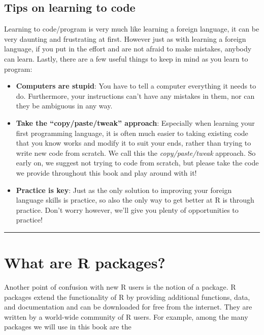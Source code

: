 \documentclass[12pt,]{krantz}
\providecommand{\tightlist}{%
  \setlength{\itemsep}{0pt}\setlength{\parskip}{0pt}}
\begin{document}
\subsection{Tips on learning to code}\label{tips-on-learning-to-code}

Learning to code/program is very much like learning a foreign language,
it can be very daunting and frustrating at first. However just as with
learning a foreign language, if you put in the effort and are not afraid
to make mistakes, anybody can learn. Lastly, there are a few useful
things to keep in mind as you learn to program:

\begin{itemize}
\tightlist
\item
  \textbf{Computers are stupid}: You have to tell a computer everything
  it needs to do. Furthermore, your instructions can't have any mistakes
  in them, nor can they be ambiguous in any way.
\item
  \textbf{Take the ``copy/paste/tweak'' approach}: Especially when
  learning your first programming language, it is often much easier to
  taking existing code that you know works and modify it to suit your
  ends, rather than trying to write new code from scratch. We call this
  the \emph{copy/paste/tweak} approach. So early on, we suggest not
  trying to code from scratch, but please take the code we provide
  throughout this book and play around with it!
\item
  \textbf{Practice is key}: Just as the only solution to improving your
  foreign language skills is practice, so also the only way to get
  better at R is through practice. Don't worry however, we'll give you
  plenty of opportunities to practice!
\end{itemize}

\begin{center}\rule{0.5\linewidth}{\linethickness}\end{center}

\section{What are R packages?}\label{packages}

Another point of confusion with new R users is the notion of a package.
R packages extend the functionality of R by providing additional
functions, data, and documentation and can be downloaded for free from
the internet. They are written by a world-wide community of R users. For
example, among the many packages we will use in this book are the
\end{document}
